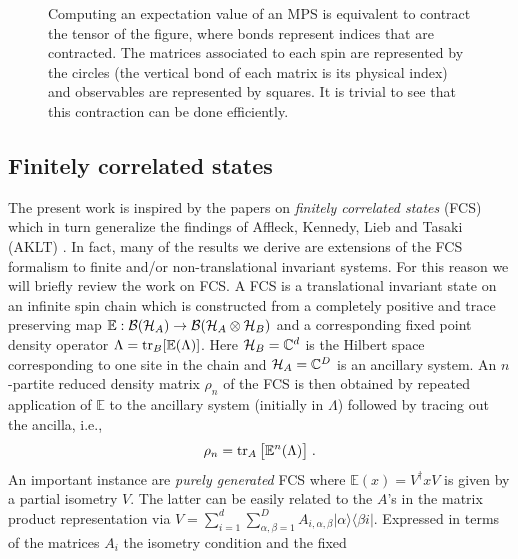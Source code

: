 \documentclass[aps,prl,epsfig,graphics,floatfix,mathbbm,a4paper]{article}
\newcommand{\1}{\mathbbm{1}}
\renewcommand{\>}{\rangle}
\newcommand{\<}{\langle}
\begin{document}
\begin{figure} [htbp]
    \centerline{} %
    \vspace*{13pt} \caption{\label{tensor-net}{\small Computing an
            expectation value of an MPS is equivalent to contract the tensor
            of the figure, where bonds represent indices that are contracted. The matrices associated to each spin are represented
            by the circles (the vertical bond of each matrix is its physical index) and observables are represented by squares.
            It is trivial to see that this contraction can be done efficiently.}}
\end{figure}



\subsection{Finitely correlated states}
The present work is inspired by the papers on \emph{finitely
    correlated states} (FCS) which in turn generalize the findings of
Affleck, Kennedy, Lieb and Tasaki (AKLT) \cite{AKLT}. In fact,
many of the results we derive are extensions of the FCS formalism
to finite and/or non-translational invariant systems. For this
reason we will briefly review the work on FCS. A FCS is a
translational invariant state on an infinite spin chain which is
constructed from a completely positive and trace preserving map
$\mathbb{E}:{\cal B}({\cal H}_A)\rightarrow {\cal B}({\cal
        H}_A\otimes {\cal H}_B)$ and a corresponding fixed point density
operator $\Lambda=\operatorname{tr}_B[\mathbb{E}(\Lambda)]$. Here ${\cal
            H}_B=\mathbb{C}^d$ is the Hilbert space corresponding to one site
in the chain and ${\cal H}_A=\mathbb{C}^D$ is an ancillary system.
An $n$-partite reduced density matrix $\rho_n$ of the FCS is then
obtained by repeated application of $\mathbb{E}$ to the ancillary
system (initially in $\Lambda$) followed by tracing out the
ancilla, i.e., \begin{equation}
    \rho_n=\operatorname{tr}_A\big[\mathbb{E}^n(\Lambda)\big]\;.
\end{equation}
An important instance are \emph{purely generated} FCS where
$\mathbb{E}(x)=V^\dag x V$ is given by a partial isometry $V$. The
latter can be easily related to the $A$'s in the matrix product
representation via $V=\sum_{i=1}^d\sum_{\alpha,\beta=1}^D
    A_{i,\alpha,\beta} |\alpha\rangle\langle\beta i|$. Expressed in
terms of the matrices $A_i$ the isometry condition and the fixed
\end{document}
